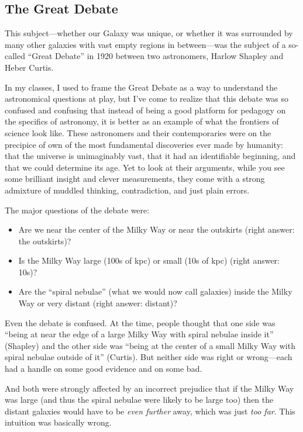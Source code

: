 \documentclass[12pt, preprint]{aastex}
\begin{document}
\subsection{The Great Debate}

This subject---whether our Galaxy was unique, or whether it was
surrounded by many other galaxies with vast empty regions in
between---was the subject of a so-called ``Great Debate'' in 1920
between two astronomers, Harlow Shapley and Heber Curtis.

In my classes, I used to frame the Great Debate as a way to understand
the astronomical questions at play, but I've come to realize that this
debate was so confused and confusing that instead of being a good
platform for pedagogy on the specifics of astronomy, it is better as
an example of what the frontiers of science look like. These
astronomers and their contemporaries were on the precipice of own of
the most fundamental discoveries ever made by humanity: that the
universe is unimaginably vast, that it had an identifiable beginning,
and that we could determine its age. Yet to look at their arguments,
while you see some brilliant insight and clever measurements, they
come with a strong admixture of muddled thinking, contradiction, and
just plain errors.

The major questions of the debate were:
\begin{itemize}
\item Are we near the center of the Milky Way or near the outskirts
  (right answer: the outskirts)?
\item Is the Milky Way large (100s of kpc) or small (10s of kpc)
  (right answer: 10s)?
\item Are the ``spiral nebulae'' (what we would now call galaxies)
  inside the Milky Way or very distant (right answer: distant)?
\end{itemize}
Even the debate is confused. At the time, people thought that one side
was ``being at near the edge of a large Milky Way with spiral nebulae
inside it'' (Shapley) and the other side was ``being at the center of
a small Milky Way with spiral nebulae outside of it'' (Curtis).  But
neither side was right or wrong---each had a handle on some good
evidence and on some bad.

And both were strongly affected by an incorrect prejudice that if the
Milky Way was large (and thus the spiral nebulae were likely to be
large too) then the distant galaxies would have to be {\it even
  further} away, which was just {\it too far}.  This intuition was
basically wrong.
\end{document}
